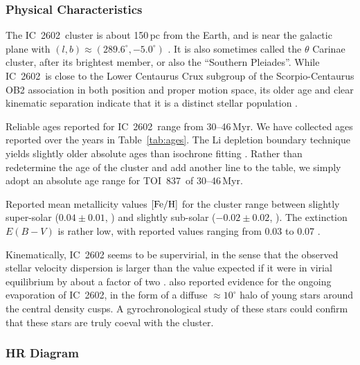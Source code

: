 \documentclass[12pt,twocolumn,tighten]{aastex63}
\newcommand{\tn}{TOI~837} %
\newcommand{\cn}{IC~2602} %
\begin{document}


\subsubsection{Physical Characteristics}
\label{subsec:clusterchar}

The \cn\ cluster is about 150$\,$pc from the Earth, and is near the
galactic plane with $(l,b)\approx(289.6^\circ, -5.0^\circ)$
\citep{cantatgaudin_gaia_2018}.  It is also sometimes called the
$\theta$ Carinae cluster, after its brightest member, or also the
``Southern Pleiades''.  While \cn\ is close to the Lower Centaurus
Crux subgroup of the Scorpio-Centaurus OB2 association in both
position and proper motion space, its older age and clear kinematic
separation indicate that it is a distinct stellar population
\citep{de_zeeuw_hipparcos_1999,damiani_stellar_2019}.

Reliable ages reported for \cn\ range from 30--46$\,$Myr.  We have
collected ages reported over the years in Table~\ref{tab:ages}.  The
Li depletion boundary technique yields slightly older absolute ages
than isochrone fitting \citep{dobbie_ic_2010,randich_gaiaeso_2018}.
Rather than redetermine the age of the cluster and add another line to
the table, we simply adopt an absolute age range for \tn\ of
30--46$\,$Myr.

Reported mean metallicity values ${\rm [Fe/H]}$ for the cluster range
between slightly super-solar ($0.04\pm0.01$,
\citealt{baratella_gaia-eso_2020}) and slightly sub-solar ($-0.02 \pm
0.02$, \citealt{netopil_metallicity_2016}).  The extinction $E(B-V)$
is rather low, with reported values ranging from 0.03 to 0.07
\citep[{\it e.g.},][]{randich_gaiaeso_2018}.

Kinematically, IC~2602 seems to be supervirial, in the sense that the
observed stellar velocity dispersion is larger than the value expected
if it were in virial equilibrium by about a factor of two
\citep{bravi_gaia-eso_2018}.  \citet{damiani_stellar_2019} also
reported evidence for the ongoing evaporation of \cn, in the form of a
diffuse $\approx10^\circ$ halo of young stars around the central
density cusps.  A gyrochronological study of these stars could confirm
that these stars are truly coeval with the cluster.


\subsubsection{HR Diagram}
\label{subsec:hr}
\end{document}
